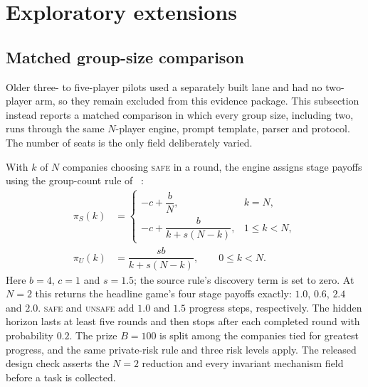 \documentclass{article}
\newcommand{\Safe}{\textsc{safe}}
\newcommand{\Unsafe}{\textsc{unsafe}}
\DeclareRobustCommand{\citet}[1]{\citeauthor{#1}~\shortcite{#1}}
\begin{document}
\clearpage
\section{Exploratory extensions}

\subsection{Matched group-size comparison}
\label{app:nplayer-matched}

Older three- to five-player pilots used a separately built lane and had no
two-player arm, so they remain excluded from this evidence package. This
subsection instead reports a matched comparison in which every group size,
including two, runs through the same $N$-player engine, prompt template, parser
and protocol. The number of seats is the only field deliberately varied.

With $k$ of $N$ companies choosing \Safe{} in a round, the engine assigns stage
payoffs using the group-count rule of \citet{to_regulate_or_not}:
\begin{equation}
  \begin{aligned}
    \pi_S(k) &=
    \begin{cases}
      -c + \dfrac{b}{N}, & k=N,\\[4pt]
      -c + \dfrac{b}{k+s(N-k)}, & 1\leq k<N,
    \end{cases}\\[5pt]
    \pi_U(k) &= \dfrac{s b}{k+s(N-k)}, \qquad 0\leq k<N.
  \end{aligned}
  \label{eq:nplayer-matched-payoff}
\end{equation}
Here $b=4$, $c=1$ and $s=1.5$; the source rule's discovery term is set to
zero. At $N=2$ this returns the headline game's four stage payoffs exactly:
$1.0$, $0.6$, $2.4$ and $2.0$. \Safe{} and \Unsafe{} add $1.0$ and $1.5$
progress steps, respectively. The hidden horizon lasts at least five rounds
and then stops after each completed round with probability $0.2$. The prize
$B=100$ is split among the companies tied for greatest progress, and the same
private-risk rule and three risk levels apply. The released design check
asserts the $N=2$ reduction and every invariant mechanism field before a task
is collected.
\end{document}

